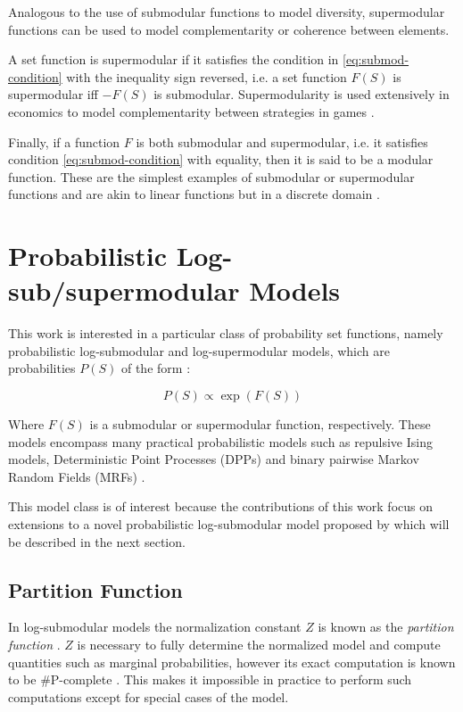Analogous to the use of submodular functions to model diversity, supermodular functions can be used to model complementarity or coherence between elements.

A set function is supermodular if it satisfies the condition in \eqref{eq:submod-condition} with the inequality sign reversed, i.e. a set function $F(S)$ is supermodular iff $-F(S)$ is submodular. Supermodularity is used extensively in economics to model complementarity between strategies in games \citep{amir2005supermodularity}.

Finally, if a function $F$ is both submodular and supermodular, i.e. it satisfies condition \eqref{eq:submod-condition} with equality, then it is said to be a modular function. These are the simplest examples of submodular or supermodular functions and are akin to linear functions but in a discrete domain \citep{krause14submodular}.

\section{Probabilistic Log-sub/supermodular Models}

This work is interested in a particular class of probability set functions, namely probabilistic log-submodular and log-supermodular models, which are probabilities $P(S)$ of the form \citep{djolonga14variational}:

\begin{equation}
  P(S) \propto \exp(F(S))
\end{equation}

Where $F(S)$ is a submodular or supermodular function, respectively. These models encompass many practical probabilistic models such as repulsive Ising models, Deterministic Point Processes (DPPs) and binary pairwise Markov Random Fields (MRFs) \citep{djolonga14variational, djolonga15scalable}.

This model class is of interest because the contributions of this work focus on extensions to a novel probabilistic log-submodular model proposed by \citet{tschiatschek16learning} which will be described in the next section.

\subsection{Partition Function}
\label{sec:general-z}

In log-submodular models the normalization constant $Z$ is known as the \textit{partition function} \citep{djolonga14variational}. $Z$ is necessary to fully determine the normalized model and compute quantities such as marginal probabilities, however its exact computation is known to be \#P-complete \citep{jerrum1990}. This makes it impossible in practice to perform such computations except for special cases of the model.

